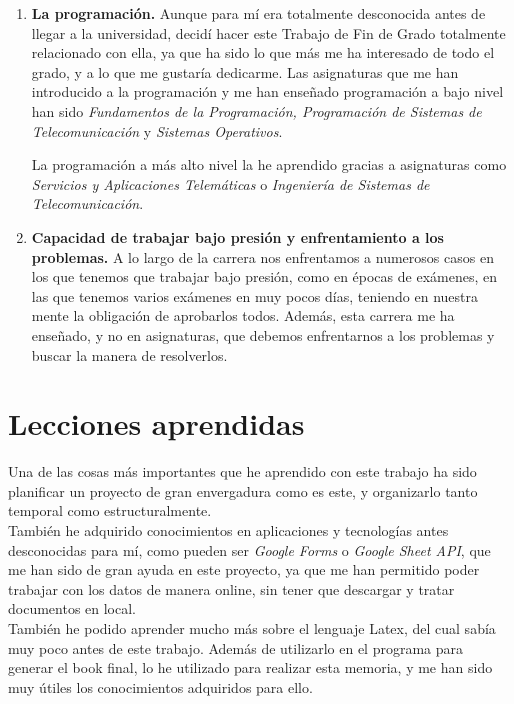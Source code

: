 \documentclass[a4paper, 12pt]{book}
\begin{document}
\begin{enumerate}
  \item \textbf{La programación.} Aunque para mí era totalmente desconocida antes de llegar a la universidad, decidí hacer este Trabajo de Fin de Grado totalmente relacionado con ella, ya que ha sido lo que más me ha interesado de todo el grado, y a lo que me gustaría dedicarme. Las asignaturas que me han introducido a la programación y me han enseñado programación a bajo nivel han sido \textit{Fundamentos de la Programación, Programación de Sistemas de Telecomunicación} y \textit{Sistemas Operativos}.
  
  La programación a más alto nivel la he aprendido gracias a asignaturas como \textit{Servicios y Aplicaciones Telemáticas} o \textit{Ingeniería de Sistemas de Telecomunicación}.
  \item \textbf{Capacidad de trabajar bajo presión y enfrentamiento a los problemas.} A lo largo de la carrera nos enfrentamos a numerosos casos en los que tenemos que trabajar bajo presión, como en épocas de exámenes, en las que tenemos varios exámenes en muy pocos días, teniendo en nuestra mente la obligación de aprobarlos todos. Además, esta carrera me ha enseñado, y no en asignaturas, que debemos enfrentarnos a los problemas y buscar la manera de resolverlos.
\end{enumerate}


\section{Lecciones aprendidas}
\label{sec:lecciones_aprendidas}
Una de las cosas más importantes que he aprendido con este trabajo ha sido planificar un proyecto de gran envergadura como es este, y organizarlo tanto temporal como estructuralmente.\\

También he adquirido conocimientos en aplicaciones y tecnologías antes desconocidas para mí, como pueden ser \textit{Google Forms} o \textit{Google Sheet API}, que me han sido de gran ayuda en este proyecto, ya que me han permitido poder trabajar con los datos de manera online, sin tener que descargar y tratar documentos en local.\\

También he podido aprender mucho más sobre el lenguaje Latex, del cual sabía muy poco antes de este trabajo. Además de utilizarlo en el programa para generar el book final, lo he utilizado para realizar esta memoria, y me han sido muy útiles los conocimientos adquiridos para ello.\\
\end{document}
